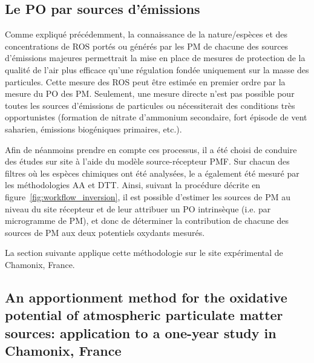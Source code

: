 \subsection{Le PO par sources d'émissions}%
\label{sub:le_po_par_sources_d_émission}

Comme expliqué précédemment, la connaissance de la nature/espèces  et des concentrations de ROS portés ou générés par les PM de
chacune des sources d'émissions majeures permettrait la mise en place de mesures de
protection de la qualité de l'air plus efficace qu'une régulation fondée uniquement sur la
masse des particules.
Cette mesure des ROS peut être estimée en premier ordre par la mesure du PO des PM.
Seulement, une mesure directe n'est pas possible pour toutes les sources d'émissions de particules ou nécessiterait des conditions très opportunistes (formation de nitrate
d'ammonium secondaire, fort épisode de vent saharien, émissions biogéniques primaires, etc.).

Afin de néanmoins prendre en compte ces processus, il a été choisi de conduire des études
sur site à l'aide du modèle source-récepteur PMF. Sur chacun des filtres où les espèces
chimiques ont été analysées, le \POv{} a également été mesuré par les méthodologies AA et DTT. Ainsi, suivant
la procédure décrite en figure~\ref{fig:workflow_inversion}, il est possible d'estimer les
sources de PM au niveau du site récepteur et de leur attribuer un PO intrinsèque (i.e. par
microgramme de PM), et donc de déterminer la contribution de chacune des sources de PM aux
deux potentiels oxydants mesurés.

La section suivante applique cette méthodologie sur le site expérimental de Chamonix,
France.

\subsection{An apportionment method for the oxidative potential of atmospheric particulate
matter sources: application to a one-year study in Chamonix, France}
\label{sec:weber_et_al_2018}

